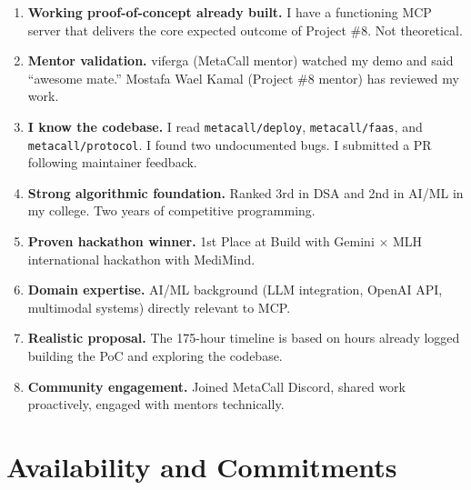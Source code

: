 \documentclass[12pt, a4paper]{article}
\begin{document}
\begin{enumerate}[leftmargin=1.5em, itemsep=5pt]
  \item \textbf{Working proof-of-concept already built.}
        I have a functioning MCP server that delivers the core
        expected outcome of Project \#8. Not theoretical.

  \item \textbf{Mentor validation.}
        viferga (MetaCall mentor) watched my demo and said
        ``awesome mate.'' Mostafa Wael Kamal (Project \#8
        mentor) has reviewed my work.

  \item \textbf{I know the codebase.}
        I read \texttt{metacall/deploy},
        \texttt{metacall/faas}, and
        \texttt{metacall/protocol}. I found two
        undocumented bugs. I submitted a PR following
        maintainer feedback.

  \item \textbf{Strong algorithmic foundation.}
        Ranked 3rd in DSA and 2nd in AI/ML in my college.
        Two years of competitive programming.

  \item \textbf{Proven hackathon winner.}
        1st Place at Build with Gemini $\times$ MLH
        international hackathon with MediMind.

  \item \textbf{Domain expertise.}
        AI/ML background (LLM integration, OpenAI API,
        multimodal systems) directly relevant to MCP.

  \item \textbf{Realistic proposal.}
        The 175-hour timeline is based on hours already
        logged building the PoC and exploring the codebase.

  \item \textbf{Community engagement.}
        Joined MetaCall Discord, shared work proactively,
        engaged with mentors technically.
\end{enumerate}

\section{Availability and Commitments}
\end{document}
